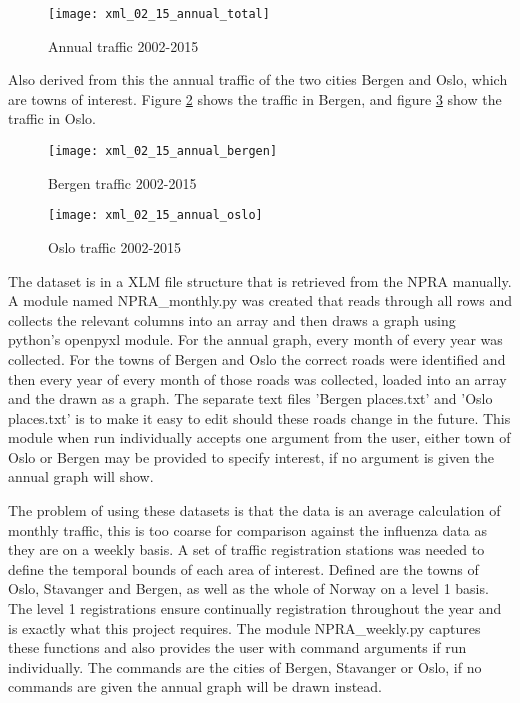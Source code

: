 \begin{figure}[ht]
\texttt{[image: xml\_02\_15\_annual\_total]}
\centering
\caption{Annual traffic 2002-2015}
\label{fig:anualtotal}
\end{figure}

Also derived from this the annual traffic of the two cities Bergen and Oslo, which are towns of interest. Figure \ref{fig:anualbergen} shows the traffic in Bergen, and figure \ref{fig:anualoslo} show the traffic in Oslo.

\begin{figure}[ht]
\texttt{[image: xml\_02\_15\_annual\_bergen]}
\centering
\caption{Bergen traffic 2002-2015}
\label{fig:anualbergen}
\end{figure}

\begin{figure}[ht]
\texttt{[image: xml\_02\_15\_annual\_oslo]}
\centering
\caption{Oslo traffic 2002-2015}
\label{fig:anualoslo}
\end{figure}
The dataset is in a XLM file structure that is retrieved from the NPRA manually. A module named NPRA_monthly.py was created that reads through all rows and collects the relevant columns into an array and then draws a graph using python's openpyxl module. For the annual graph, every month of every year was collected. For the towns of Bergen and Oslo the correct roads were identified and then every year of every month of those roads was collected, loaded into an array and the drawn as a graph. The separate text files 'Bergen places.txt' and 'Oslo places.txt' is to make it easy to edit should these roads change in the future. This module when run individually accepts one argument from the user, either town of Oslo or Bergen may be provided to specify interest, if no argument is given the annual graph will show.

The problem of using these datasets is that the data is an average calculation of monthly traffic, this is too coarse for comparison against the influenza data as they are on a weekly basis. A set of traffic registration stations was needed to define the temporal bounds of each area of interest. Defined are the towns of Oslo, Stavanger and Bergen, as well as the whole of Norway on a level 1 basis. The level 1 registrations ensure continually registration throughout the year and is exactly what this project requires. The module NPRA_weekly.py captures these functions and also provides the user with command arguments if run individually. The commands are the cities of Bergen, Stavanger or Oslo, if no commands are given the annual graph will be drawn instead.

